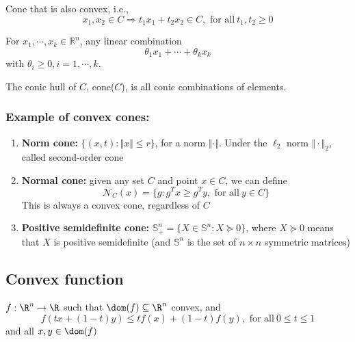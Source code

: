 \documentclass[a4paper]{article}
\begin{document}
{\begin{defi}
  Cone that is also convex, i.e.,
  \[
    x_1, x_2 \in C \Longrightarrow  t_1 x_1 + t_2 x_2 \in C,\text{\ for\ all}\ t_1, t_2 \geq 0 
  \]
\end{defi}

\begin{defi}
  For $x_1,\cdots,x_k \in \mathbb{R}^n$, any linear combination
  \[
    \theta_1 x_1 + \cdots + \theta_k x_k
    \]
  with $\theta_i \geq 0, i=1,\cdots, k$.
\end{defi}

\begin{defi}
  The conic hull of $ C $, cone($C$), is all conic combinations of elements.
\end{defi}

\subsubsection{Example of convex cones:}
\begin{enumerate}
  \item \textbf{Norm cone:} $\{(x,t) : \Vert x \Vert \leq r \}$, for a norm $\Vert \cdot \Vert$. Under the $\ell_2$ norm $\Vert \cdot \Vert_2$, called second-order cone
  \item \textbf{Normal cone:} given any set $C$ and point $x \in C$, we can define
  \[
    \mathcal{N}_C (x) = \{g : g^T x \geq g^T y, \text{\ for \ all} \ y \in C\} 
    \]
  This is always a convex cone, regardless of $C$
  \item \textbf{Positive semidefinite cone:} $\mathbb{S}^n_+ = \{X \in \mathbb{S}^n : X \succeq 0 \}$, where $X \succeq 0 $ means that $X$ is positive semidefinite (and $\mathbb{S}^n$ is the set of $n \times n$ symmetric matrices)
\end{enumerate}

\subsection{Convex function}
\begin{defi}
  $f: \R^n \rightarrow \R$ such that $\dom (f) \subseteq \R^n$ convex, and 
  \[
      f(tx + (1-t)y) \leq tf(x) + (1-t)f(y),\text{\ for\ all}\ 0 \leq t \leq 1 
  \]
  and all $x, y \in \dom (f)$
\end{defi}

\begin{center}
\end{center}

}
\end{document}
